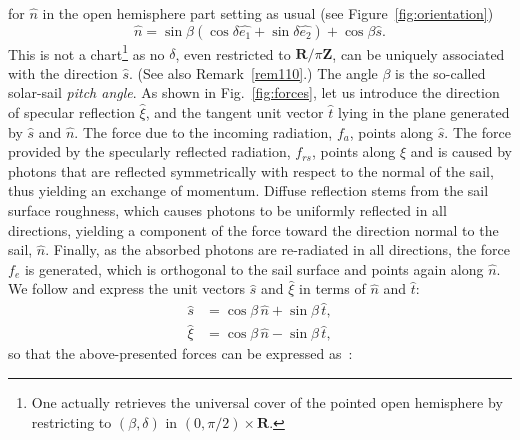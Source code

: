 \documentclass[AMA,STIX1COL]{WileyNJD-v2}
\newcommand{\uvect}[1]{\hat{#1}}
\newcommand{\vect}[1]{#1}
\newcommand{\R}{\mathbf{R}}
\newcommand{\Z}{\mathbf{Z}}
\begin{document}
for $\uvect{n}$ in the open hemisphere part setting as usual (see Figure~\ref{fig:orientation})
$$ \uvect{n} =  \sin\beta(\cos\delta\uvect{e_1}+\sin\delta\uvect{e_2})+\cos\beta\uvect{s}. $$ 
This is not a chart\footnote{One actually retrieves the universal cover
of the pointed open hemisphere by restricting to $(\beta,\delta)$ in $(0,\pi/2) \times \R$.}
as no $\delta$, even restricted to $\R/\pi\Z$, can be
uniquely associated with the direction $\uvect{s}$. (See also Remark~\ref{rem110}.)
The angle $\beta$ is the so-called solar-sail \emph{pitch angle}.
%
As shown in Fig.~\ref{fig:forces},
let us introduce the direction of specular reflection $\uvect{\xi}$, and the tangent unit vector $\uvect{t}$ lying in the plane generated by $\uvect{s}$ and $\uvect{n}$.
The force due to the incoming radiation, $\vect{f}_a$, points along $\uvect{s}$. The force provided by the specularly reflected radiation, $\vect{f}_{rs}$, points along $\uvect{\xi}$ and is caused by photons that are reflected symmetrically with respect to the normal of the sail, thus yielding an exchange of momentum. Diffuse reflection stems from the sail surface roughness, which causes photons to be uniformly reflected in all directions, yielding a component of the force toward the direction normal to the sail, $\uvect{n}$. Finally, as the absorbed photons are re-radiated in all directions, the force $\vect{f}_{e}$ is generated, which is orthogonal to the sail surface and points again along $\uvect{n}$. 
We follow \cite[Chap.~2]{McInnes_1999} and express the unit vectors $\uvect{s}$ and $\uvect{\xi}$ in terms of
$\uvect{n}$ and $\uvect{t}$:
\begin{equation}
	\begin{aligned}
		\uvect{s} &= \cos \beta \, \uvect{n} + \sin \beta \, \uvect{t},\\
		\uvect{\xi} &= \cos \beta \, \uvect{n} - \sin \beta \,  \uvect{t},
	\end{aligned}
\end{equation}
so that the above-presented forces can be expressed as~\cite{Rios_Reyes_2005}:
\end{document}
